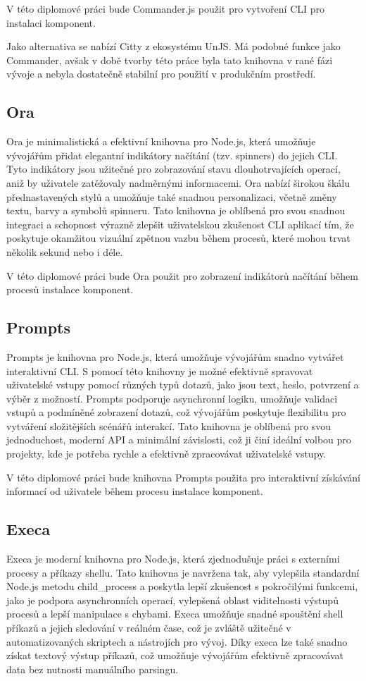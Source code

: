 V této diplomové práci bude Commander.js použit pro vytvoření CLI pro instalaci komponent.

Jako alternativa se nabízí Citty z ekosystému UnJS. Má podobné funkce jako Commander, avšak v době tvorby této práce byla tato knihovna v rané fázi vývoje a nebyla dostatečně stabilní pro použití v produkčním prostředí. \cite{Citty}

\subsection{Ora}
Ora je minimalistická a efektivní knihovna pro Node.js, která umožňuje vývojářům přidat elegantní indikátory načítání (tzv. spinners) do jejich CLI. Tyto indikátory jsou užitečné pro zobrazování stavu dlouhotrvajících operací, aniž by uživatele zatěžovaly nadměrnými informacemi. Ora nabízí širokou škálu přednastavených stylů a umožňuje také snadnou personalizaci, včetně změny textu, barvy a symbolů spinneru. Tato knihovna je oblíbená pro svou snadnou integraci a schopnost výrazně zlepšit uživatelskou zkušenost CLI aplikací tím, že poskytuje okamžitou vizuální zpětnou vazbu během procesů, které mohou trvat několik sekund nebo i déle. \cite{Ora}

V této diplomové práci bude Ora použit pro zobrazení indikátorů načítání během procesů instalace komponent.

\subsection{Prompts}
Prompts je knihovna pro Node.js, která umožňuje vývojářům snadno vytvářet interaktivní CLI. S pomocí této knihovny je možné efektivně spravovat uživatelské vstupy pomocí různých typů dotazů, jako jsou text, heslo, potvrzení a výběr z možností. Prompts podporuje asynchronní logiku, umožňuje validaci vstupů a podmíněné zobrazení dotazů, což vývojářům poskytuje flexibilitu pro vytváření složitějších scénářů interakcí. Tato knihovna je oblíbená pro svou jednoduchost, moderní API a minimální závislosti, což ji činí ideální volbou pro projekty, kde je potřeba rychle a efektivně zpracovávat uživatelské vstupy. \cite{Prompts}

V této diplomové práci bude knihovna Prompts použita pro interaktivní získávání informací od uživatele během procesu instalace komponent.

\subsection{Execa}
Execa je moderní knihovna pro Node.js, která zjednodušuje práci s externími procesy a příkazy shellu. Tato knihovna je navržena tak, aby vylepšila standardní Node.js metodu child\_process a poskytla lepší zkušenost s pokročilými funkcemi, jako je podpora asynchronních operací, vylepšená oblast viditelnosti výstupů procesů a lepší manipulace s chybami. Execa umožňuje snadné spouštění shell příkazů a jejich sledování v reálném čase, což je zvláště užitečné v automatizovaných skriptech a nástrojích pro vývoj. Díky execa lze také snadno získat textový výstup příkazů, což umožňuje vývojářům efektivně zpracovávat data bez nutnosti manuálního parsingu. \cite{Execa}

